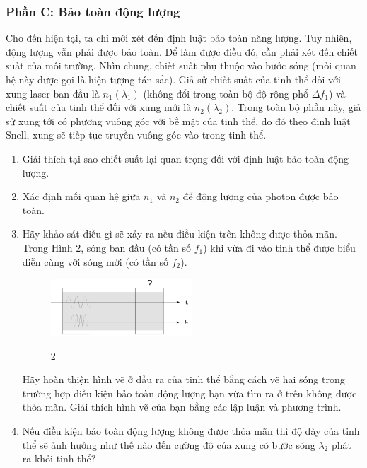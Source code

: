 \subsubsection*{Phần C: Bảo toàn động lượng}
\noindent Cho đến hiện tại, ta chỉ mới xét đến định luật bảo toàn năng lượng. Tuy nhiên, động lượng vẫn phải được bảo toàn. Để làm được điều đó, cần phải xét đến chiết suất của môi trường. Nhìn chung, chiết suất phụ thuộc vào bước sóng (mối quan hệ này được gọi là hiện tượng tán sắc). Giả sử chiết suất của tinh thể đối với xung laser ban đầu là $n_1(\lambda_1)$ (không đổi trong toàn bộ độ rộng phổ $\Delta f_1$) và chiết suất của tinh thể đối với xung mới là $n_2(\lambda_2)$. Trong toàn bộ phần này, giả sử xung tới có phương vuông góc với bề mặt của tinh thể, do đó theo định luật Snell, xung sẽ tiếp tục truyền vuông góc vào trong tinh thể.
\begin{enumerate}
  \item Giải thích tại sao chiết suất lại quan trọng đối với định luật bảo toàn động lượng.
  \item Xác định mối quan hệ giữa $n_1$ và $n_2$ để động lượng của photon được bảo toàn.
  \item Hãy khảo sát điều gì sẽ xảy ra nếu điều kiện trên không được thỏa mãn. Trong Hình 2, sóng ban đầu (có tần số $f_1$) khi vừa đi vào tinh thể được biểu diễn cùng với sóng mới (có tần số $f_2$).
        \begin{figure}[H]
          \centering
          \includegraphics[width=0.5\textwidth]{Figures/Problems/Fig 2.1.png}
          \begin{center}
            \figurename{ 2}
          \end{center}
        \end{figure}
        \vspace{-0.5cm}
        Hãy hoàn thiện hình vẽ ở đầu ra của tinh thể bằng cách vẽ hai sóng trong trường hợp điều kiện bảo toàn động lượng bạn vừa tìm ra ở trên không được thỏa mãn. Giải thích hình vẽ của bạn bằng các lập luận và phương trình.
  \item Nếu điều kiện bảo toàn động lượng không được thỏa mãn thì độ dày của tinh thể sẽ ảnh hưởng như thế nào đến cường độ của xung có bước sóng $\lambda_2$ phát ra khỏi tinh thể?
\end{enumerate}
